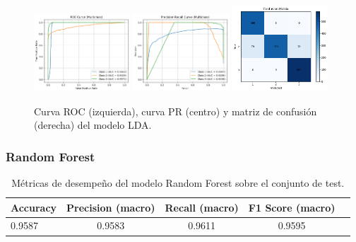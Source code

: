 \documentclass[11pt]{article}
\begin{document}
\begin{figure}[H]
    \centering
    \includegraphics[width=0.32\textwidth]{figures/lda_roc.png}
    \hfill
    \includegraphics[width=0.32\textwidth]{figures/lda_pr.png}
    \hfill
    \includegraphics[width=0.32\textwidth]{figures/lda_conf_matrix.png}
    \caption{Curva ROC (izquierda), curva PR (centro) y matriz de confusión (derecha) del modelo LDA.}
    \label{fig:lda_figures}
\end{figure}

\subsubsection*{Random Forest}
\begin{table}[H]
    \centering
    \begin{tabular}{lcccc}
        \toprule
        \textbf{Accuracy} & \textbf{Precision (macro)} & \textbf{Recall (macro)} & \textbf{F1 Score (macro)} \\
        \midrule
        0.9587 & 0.9583 & 0.9611 & 0.9595 \\
        \bottomrule
    \end{tabular}
    \caption{Métricas de desempeño del modelo Random Forest sobre el conjunto de test.}
    \label{tab:rf_scores}
\end{table}
\end{document}
